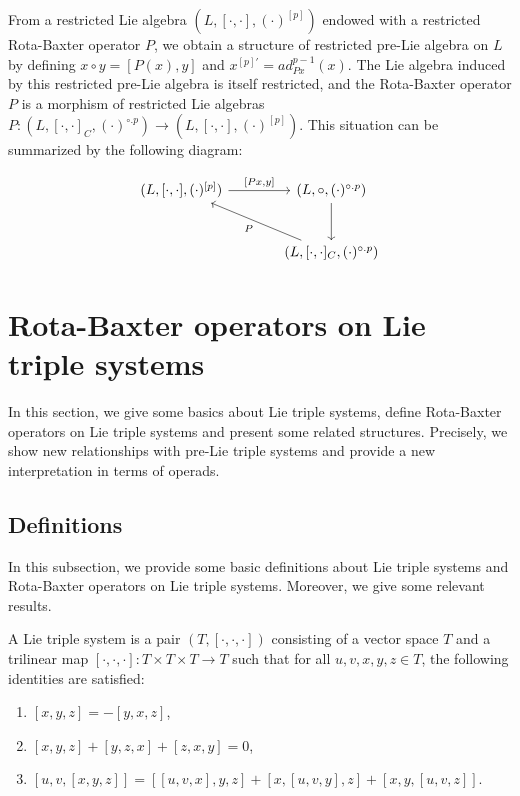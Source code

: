 \documentclass[11pt, twoside]{article}
\begin{document}
From a restricted Lie algebra $(L,[\cdot,\cdot],(\cdot)^{[p]})$ endowed with a restricted Rota-Baxter operator $P$, we obtain a structure of restricted pre-Lie algebra on $L$ by defining $x\circ y=[P(x), y]$ and $x^{[p]'}= ad_{Px}^{p-1}(x)  $. The Lie algebra induced by this restricted pre-Lie algebra is itself restricted, and the Rota-Baxter operator $P$ is a morphism of restricted Lie algebras $P:(L,[\cdot,\cdot]_C,(\cdot)^{\circ.p} )\to (L,[\cdot,\cdot],(\cdot)^{[p]}) $. This situation can be summarized by the following diagram:

\[\begin{tikzcd}[row sep=large, column sep=large]
	{(L,[\cdot,\cdot],(\cdot)^{[p]})} & {(L,\circ, (\cdot)^{\circ.p})} \\
	& {(L,[\cdot,\cdot]_C,(\cdot)^{\circ.p})}
	\arrow["{[Px,y]}", from=1-1, to=1-2]
	\arrow[from=1-2, to=2-2]
	\arrow["P", from=2-2, to=1-1]
\end{tikzcd}\]








\section{Rota-Baxter operators on Lie triple systems}\label{s4}
In this section, we give some basics about Lie triple systems, define Rota-Baxter operators on Lie triple systems and present some related structures. Precisely, we show new relationships with pre-Lie triple systems and provide a new interpretation in terms of operads. 
\subsection{Definitions}


In this subsection, we provide some basic  definitions about  Lie triple systems and Rota-Baxter operators on Lie triple systems. Moreover, we give some relevant results.

\begin{defi}
    A Lie triple system is a pair $(T,[\cdot,\cdot,\cdot]) $ consisting of a vector space $T$ and a trilinear map $[\cdot,\cdot,\cdot]:T\times T\times T\to T $ such that for all $u,v,x,y,z\in T$, the following identities are satisfied: \begin{enumerate}
        \item  $[x,y,z]= -[y,x,z] $,
        \item  $[x,y,z]+ [y,z,x]+[z,x,y]=0 $,
        \item $[u,v,[x,y,z]]=[[u,v,x],y,z]+ [x,[u,v,y],z] + [x,y,[u,v,z]] $. 
    \end{enumerate} 
\end{defi}
\end{document}
